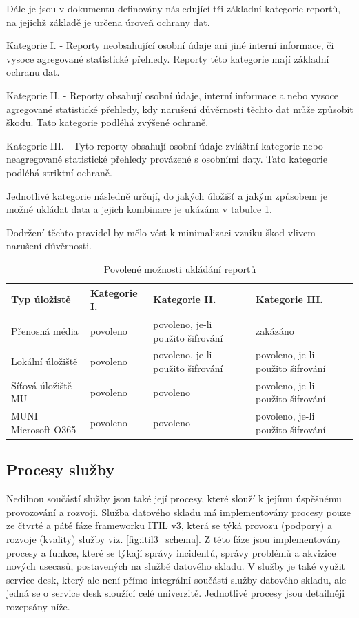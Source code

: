 \documentclass[
  digital,     %
  twoside,     %
  lof,         %
  lot,         %
]{fithesis4}
\begin{document}
Dále je jsou v dokumentu definovány následující tři základní kategorie reportů, na jejichž základě je určena úroveň ochrany dat.
\begin{compactitem}
    \item Kategorie I. -  Reporty neobsahující osobní údaje ani jiné interní informace, či vysoce agregované statistické přehledy. Reporty této kategorie mají základní ochranu dat.
    \item Kategorie II. - Reporty obsahují osobní údaje, interní informace a nebo vysoce agregované statistické přehledy, kdy narušení důvěrnosti těchto dat může způsobit škodu. Tato kategorie podléhá zvýšené ochraně.
    \item Kategorie III. - Tyto reporty obsahují osobní údaje zvláštní kategorie nebo neagregované statistické přehledy provázené s osobními daty. Tato kategorie podléhá striktní ochraně.
\end{compactitem}

Jednotlivé kategorie následně určují, do jakých úložišť a jakým způsobem je možné ukládat data a jejich kombinace je ukázána v tabulce \ref{tab:security_storage}.

Dodržení těchto pravidel by mělo vést k minimalizaci vzniku škod vlivem narušení důvěrnosti.

\begin{table}
  \begin{tabularx}{\textwidth}{|p{2.5cm}|p{2.5cm}|p{2.5cm}|p{3.5cm}|}
    \toprule
    Typ úložistě & Kategorie I.  & Kategorie II. & Kategorie III. \\
    \midrule
    Přenosná média & povoleno & povoleno, je-li použito šifrování & zakázáno \\
    Lokální úložiště & povoleno & povoleno, je-li použito šifrování & povoleno, je-li použito šifrování \\
    Síťová úložiště MU & povoleno &
    povoleno & povoleno, je-li použito šifrování \\
    MUNI Microsoft O365 & povoleno &
    povoleno & povoleno, je-li použito šifrování \\
    \bottomrule
  \end{tabularx}
  \caption{Povolené možnosti ukládání reportů}
  \label{tab:security_storage}
\end{table}

\subsection{Procesy služby}
Nedílnou součástí služby jsou také její procesy, které slouží k jejímu úspěšnému provozování a rozvoji. Služba datového skladu má implementovány procesy pouze ze čtvrté a páté fáze frameworku ITIL v3, která se týká provozu (podpory)  a rozvoje (kvality) služby viz. \ref{fig:itil3_schema}. Z této fáze jsou implementovány procesy a funkce, které se týkají správy incidentů, správy problémů a akvizice nových usecasů, postavených na službě datového skladu. V služby je také využit service desk, který ale není přímo integrální součástí služby datového skladu, ale jedná se o service desk sloužící celé univerzitě. Jednotlivé procesy jsou detailněji rozepsány níže.
\end{document}
